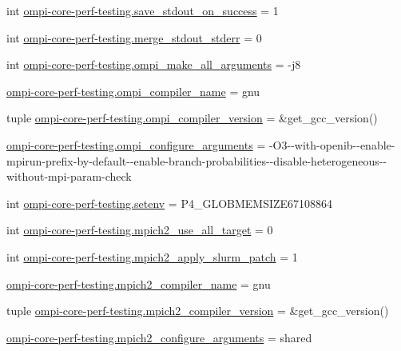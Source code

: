 \begin{DoxyCompactItemize}
\item 
int \hyperlink{namespaceompi-core-perf-testing_a5b495b6fffd94577499d4288abc7839b}{ompi-\/core-\/perf-\/testing.\-save\-\_\-stdout\-\_\-on\-\_\-success} = 1
\item 
int \hyperlink{namespaceompi-core-perf-testing_ac489ea5e767b62f66a2b4a1b28758af2}{ompi-\/core-\/perf-\/testing.\-merge\-\_\-stdout\-\_\-stderr} = 0
\item 
int \hyperlink{namespaceompi-core-perf-testing_a226230ce64cc634de35c2f12abdd54f2}{ompi-\/core-\/perf-\/testing.\-ompi\-\_\-make\-\_\-all\-\_\-arguments} = -\/j8
\item 
\hyperlink{namespaceompi-core-perf-testing_adcf0f97184536c2477a499f2db08f783}{ompi-\/core-\/perf-\/testing.\-ompi\-\_\-compiler\-\_\-name} = gnu
\item 
tuple \hyperlink{namespaceompi-core-perf-testing_a6bc0385f02dc808bb726283b67157b17}{ompi-\/core-\/perf-\/testing.\-ompi\-\_\-compiler\-\_\-version} = \&get\-\_\-gcc\-\_\-version()
\item 
\hyperlink{namespaceompi-core-perf-testing_a5417df6f672d37ff96b65443a6b2a147}{ompi-\/core-\/perf-\/testing.\-ompi\-\_\-configure\-\_\-arguments} = -\/O3-\/-\/with-\/openib-\/-\/enable-\/mpirun-\/prefix-\/by-\/default-\/-\/enable-\/branch-\/probabilities-\/-\/disable-\/heterogeneous-\/-\/without-\/mpi-\/param-\/check
\item 
int \hyperlink{namespaceompi-core-perf-testing_a1edb160fbade0abbd90944224c10612e}{ompi-\/core-\/perf-\/testing.\-setenv} = P4\-\_\-\-G\-L\-O\-B\-M\-E\-M\-S\-I\-Z\-E67108864
\item 
int \hyperlink{namespaceompi-core-perf-testing_aee0e6469e24a5453a105598477ece09c}{ompi-\/core-\/perf-\/testing.\-mpich2\-\_\-use\-\_\-all\-\_\-target} = 0
\item 
int \hyperlink{namespaceompi-core-perf-testing_a1ef643f02998e769b3601fe0312d35a2}{ompi-\/core-\/perf-\/testing.\-mpich2\-\_\-apply\-\_\-slurm\-\_\-patch} = 1
\item 
\hyperlink{namespaceompi-core-perf-testing_a514348840ab2f20da080b7ea0d9b7f73}{ompi-\/core-\/perf-\/testing.\-mpich2\-\_\-compiler\-\_\-name} = gnu
\item 
tuple \hyperlink{namespaceompi-core-perf-testing_a8bf80d7842612f727f0c9d47f51407e5}{ompi-\/core-\/perf-\/testing.\-mpich2\-\_\-compiler\-\_\-version} = \&get\-\_\-gcc\-\_\-version()
\item 
\hyperlink{namespaceompi-core-perf-testing_a7215b7a4babaf7f8f2c9f588168f9b18}{ompi-\/core-\/perf-\/testing.\-mpich2\-\_\-configure\-\_\-arguments} = shared

\end{DoxyCompactItemize}
